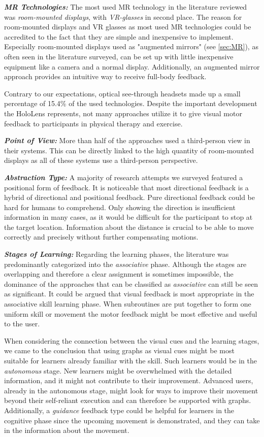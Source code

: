 \textbf{\emph{MR Technologies:}} The most used MR technology in the literature reviewed was \emph{room-mounted displays}, with \emph{VR-glasses} in second place. The reason for room-mounted displays and VR glasses as most used MR technologies could be accredited to the fact that they are simple and inexpensive to implement. Especially room-mounted displays used as "augmented mirrors" (see \autoref{sec:MR}), as often seen in the literature surveyed, can be set up with little inexpensive equipment like a camera and a normal display. Additionally, an augmented mirror approach provides an intuitive way to receive full-body feedback.

Contrary to our expectations, optical see-through headsets made up a small percentage of 15.4\% of the used technologies. Despite the important development the HoloLens represents, not many approaches utilize it to give visual motor feedback to participants in physical therapy and exercise.

\textbf{\emph{Point of View:}} More than half of the approaches used a third-person view in their systems. This can be directly linked to the high quantity of room-mounted displays as all of these systems use a third-person perspective.

\textbf{\emph{Abstraction Type:}} A majority of research attempts we surveyed featured a positional form of feedback. It is noticeable that most directional feedback is a hybrid of directional and positional feedback. Pure directional feedback could be hard for humans to comprehend. Only showing the direction is insufficient information in many cases, as it would be difficult for the participant to stop at the target location. Information about the distance is crucial to be able to move correctly and precisely without further compensating motions.

\textbf{\emph{Stages of Learning:}} Regarding the learning phases, the literature was predominantly categorized into the \emph{associative} phase. Although the stages are overlapping and therefore a clear assignment is sometimes impossible, the dominance of the approaches that can be classified as \emph{associative} can still be seen as significant. It could be argued that visual feedback is most appropriate in the associative skill learning phase. When subroutines are put together to form one uniform skill or movement the motor feedback might be most effective and useful to the user.

When considering the connection between the visual cues and the learning stages, we came to the conclusion that using graphs as visual cues might be most suitable for learners already familiar with the skill. Such learners would be in the \emph{autonomous} stage. New learners might be overwhelmed with the detailed information, and it might not contribute to their improvement. Advanced users, already in the autonomous stage, might look for ways to improve their movement beyond their self-reliant execution and can therefore be supported with graphs. Additionally, a \emph{guidance} feedback type could be helpful for learners in the cognitive phase since the upcoming movement is demonstrated, and they can take in the information about the movement.

